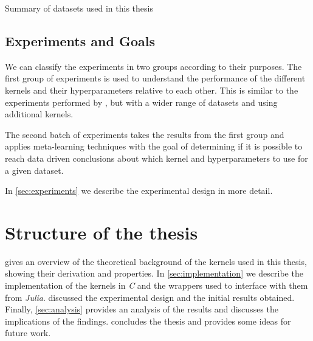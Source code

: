 \begin{table}[H]
    \caption{Summary of datasets used in this thesis}
    \label{tab:datasets}
    
\end{table}

\subsection{Experiments and Goals}%

We can classify the experiments in two groups according to their purposes. The
first group of experiments is used to understand the performance of the
different kernels and their hyperparameters relative to each other. This is
similar to the experiments performed by
\textcite{frenayParameterinsensitiveKernelExtreme2011}, but with a wider range
of datasets and using additional kernels.

The second batch of experiments takes the results from the first group and
applies meta-learning techniques with the goal of determining if it is possible
to reach data driven conclusions about which kernel and hyperparameters to use
for a given dataset.

In \cref{sec:experiments} we describe the experimental design in more detail.

%


\section{Structure of the thesis}

 gives an overview of the theoretical
background of the kernels used in this thesis, showing their derivation and
properties. In \cref{sec:implementation} we describe the implementation of the
kernels in \emph{C} and the wrappers used to interface with them from
\emph{Julia}.  discussed the experimental design and the
initial results obtained. Finally, \cref{sec:analysis} provides an analysis of
the results and discusses the implications of the findings.
 concludes the thesis and provides some ideas for future
work.

